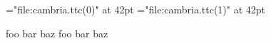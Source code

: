 \ifdefined\directlua\fi


\font\subfontone="file:cambria.ttc(0)" at 42pt
\font\subfonttwo="file:cambria.ttc(1)" at 42pt

\subfontone foo bar baz \endgraf
\subfonttwo foo bar baz \endgraf
\bye

